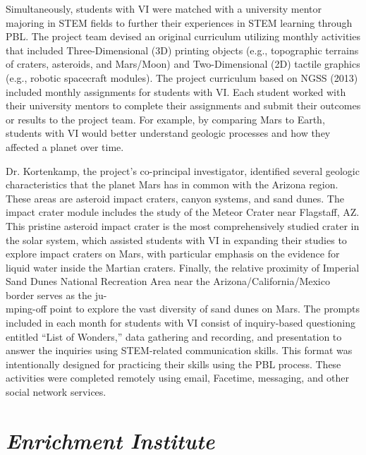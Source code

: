 \documentclass[11pt]{sig-alternate}
\begin{document}
\begin{large}
Simultaneously, students with VI were matched with a university mentor majoring in STEM fields to further their experiences in STEM learning through PBL. The project team devised an original curriculum utilizing monthly activities that included Three-Dimensional (3D) printing objects (e.g., topographic terrains of craters, asteroids, and Mars/Moon) and Two-Dimensional (2D) tactile graphics (e.g., robotic spacecraft modules). The project curriculum based on NGSS (2013) included monthly assignments for students with VI. Each student worked with their university mentors to complete their assignments and submit their outcomes or results to the project team. For example, by comparing Mars to Earth, students with VI would better understand geologic processes and how they affected a planet over time.

Dr. Kortenkamp, the project's co-principal investigator, identified several geologic characteristics that the planet Mars has in common with the Arizona region. These areas are asteroid impact craters, canyon systems, and sand dunes. The impact crater module includes the study of the Meteor Crater near Flagstaff, AZ. This pristine asteroid impact crater is the most comprehensively studied crater in the solar system, which assisted students with VI in expanding their studies to explore impact craters on Mars, with particular emphasis on the evidence for liquid water inside the Martian craters. Finally, the relative proximity of Imperial Sand Dunes National Recreation Area near the Arizona/California/Mexico border serves as the ju-\\mping-off point to explore the vast diversity of sand dunes on Mars. The prompts included in each month for students with VI consist of inquiry-based questioning entitled “List of Wonders,” data gathering and recording, and presentation to answer the inquiries using STEM-related communication skills. This format was intentionally designed for practicing their skills using the PBL process. These activities were completed remotely using email, Facetime, messaging, and other social network services.

\section*{\textit{Enrichment Institute}}


\end{large}
\end{document}
